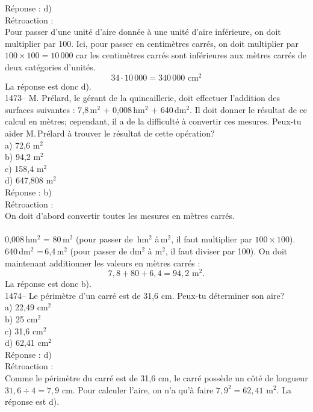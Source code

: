R\'eponse : d)\\

R\'etroaction :\\
Pour passer d'une unit\'e d'aire donn\'ee \`a une unit\'e d'aire
inf\'erieure, on doit multiplier par 100. Ici, pour passer en
centim\`etres carr\'es, on doit multiplier par
$100\times100=10\,000$ car les centim\`etres carr\'es sont
inf\'erieures aux m\`etres carr\'es de deux cat\'egories d'unit\'es.
$$34\cdot10\,000=340\,000{\textrm{ cm$^2$}}$$
La r\'eponse est donc d).\\

1473-- M. Pr\'elard, le g\'erant de la quincaillerie, doit effectuer
l'addition des surfaces suivantes : 7,8\,m$^{2}$ + 0,008\,hm$^{2}$ +
640\,dm$^{2}$. Il doit donner le r\'esultat de ce calcul en
m\`etres; cependant, il a de la difficult\'e \`a convertir ces mesures.
Peux-tu aider M.\,Pr\'elard \`a trouver le r\'esultat de cette
op\'eration?\\
a) 72,6 m$^{2}$\\
b) 94,2 m$^{2}$\\
c) 158,4 m$^{2}$\\
d) 647,808 m$^{2}$\\

R\'eponse : b)\\

R\'etroaction :\\
On doit d'abord convertir toutes les mesures en m\`etres
carr\'es.\\\\
0,008\,hm$^{2}$ = 80\,m$^2$ (pour passer de \,hm$^2$ \`a\,m$^2$, il
faut multiplier par $100\times100$). \vskip 10pt 640\,dm$^{2}$
=\,6,4\,m$^2$ (pour passer de dm$^2$ \`a m$^2$, il faut diviser par
100). \vskip 15pt On doit maintenant additionner les valeurs en
m\`etres carr\'es :$$7,8+80+6,4=94,2{\textrm{ m$^2$}}.$$
La r\'eponse est donc b).\\

1474-- Le p\'erim\`etre d'un carr\'e est de 31,6 cm. Peux-tu
d\'eterminer son aire?\\
a) 22,49 cm$^2$\\
b) 25 cm$^2$\\
c) 31,6 cm$^2$\\
d) 62,41 cm$^2$\\

R\'eponse : d)\\

R\'etroaction :\\
Comme le p\'erim\`etre du carr\'e est de 31,6 cm, le carr\'e
poss\`ede un c\^ot\'e de longueur $31,6\div4=7,9$ cm. Pour calculer
l'aire, on n'a qu'\`a faire $7,9^2=62,41{\textrm{ m$^2$}}$. La r\'eponse est
d).\\

